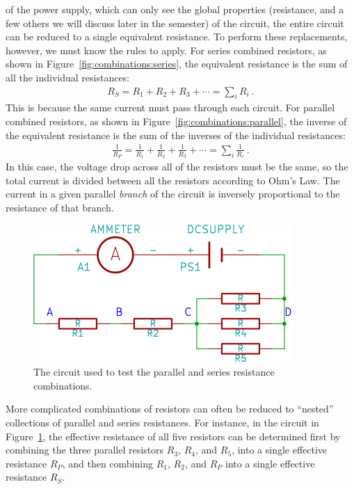 \documentclass[12pt]{article}
\begin{document}
of the power supply, which can only see the global properties
(resistance, and a few others we will discuss later in the semester)
of the circuit, the entire circuit can be reduced to a single
equivalent resistance.  To perform these replacements, however, we
must know the rules to apply.  For series combined resistors, as shown
in Figure~\ref{fig:combinations:series}, the equivalent resistance is
the sum of all the individual resistances:
\begin{gather*}
  R_S = R_1 + R_2 + R_3 + \cdots = \sum_i R_i\ .
\end{gather*}
This is because the same current must pass through each circuit.  For
parallel combined resistors, as shown in
Figure~\ref{fig:combinations:parallel}, the inverse of the equivalent
resistance is the sum of the inverses of the individual resistances:
\begin{gather*}
  \frac{1}{R_P } = \frac{1}{R_1} + \frac{1}{R_2} + \frac{1}{R_3} +
  \cdots = \sum_i \frac{1}{R_i}\ .
\end{gather*}
In this case, the voltage drop across all of the resistors must be the
same, so the total current is divided between all the resistors
according to Ohm's Law.  The current in a given parallel
\textit{branch} of the circuit is inversely proportional to the
resistance of that branch.

\begin{figure}
  \centering
  \includegraphics[width=2\textwidth/3]{figures/circuit}
  \caption{The circuit used to test the parallel and series resistance
    combinations.} 
  \label{fig:circuit}
\end{figure}
More complicated combinations of resistors can often be reduced to
``nested'' collections of parallel and series resistances.  For
instance, in the circuit in Figure~\ref{fig:circuit}, the effective
resistance of all five resistors can be determined first by combining
the three parallel resistors $R_3$, $R_4$, and $R_5$, into a single
effective resistance $R_P$, and then combining $R_1$, $R_2$, and $R_P$
into a single effective resistance $R_S$.
\end{document}

